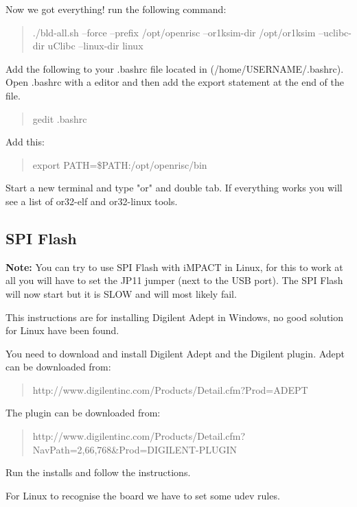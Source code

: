 \documentclass[10pt,a4paper]{article}
\begin{document}
Now we got everything! run the following command:

\begin{quote}
./bld-all.sh --force --prefix /opt/openrisc --or1ksim-dir /opt/or1ksim --uclibc-dir uClibc --linux-dir linux
\end{quote}

Add the following to your .bashrc file located in (/home/USERNAME/.bashrc). Open .bashrc with a editor and then add the export statement at the end of the file.

\begin{quote}
gedit .bashrc \newline
\end{quote}

Add this:

\begin{quote}
export PATH=\$PATH:/opt/openrisc/bin
\end{quote}

Start a new terminal and type "or" and double tab. If everything works you will see a list of or32-elf and or32-linux tools.

\subsection{SPI Flash}
\textbf{Note:} You can try to use SPI Flash with iMPACT in Linux, for this to work at all you will have to set the JP11 jumper (next to the USB port). The SPI Flash will now start but it is SLOW and will most likely fail.

This instructions are for installing Digilent Adept in Windows, no good solution for Linux have been found.

You need to download and install Digilent Adept and the Digilent plugin. Adept can be downloaded from:

\begin{quote}
http://www.digilentinc.com/Products/Detail.cfm?Prod=ADEPT
\end{quote}

The plugin can be downloaded from:

\begin{quote}
http://www.digilentinc.com/Products/Detail.cfm?NavPath=2,66,768\&Prod=DIGILENT-PLUGIN
\end{quote}

Run the installs and follow the instructions.

For Linux to recognise the board we have to set some udev rules. 
\end{document}
